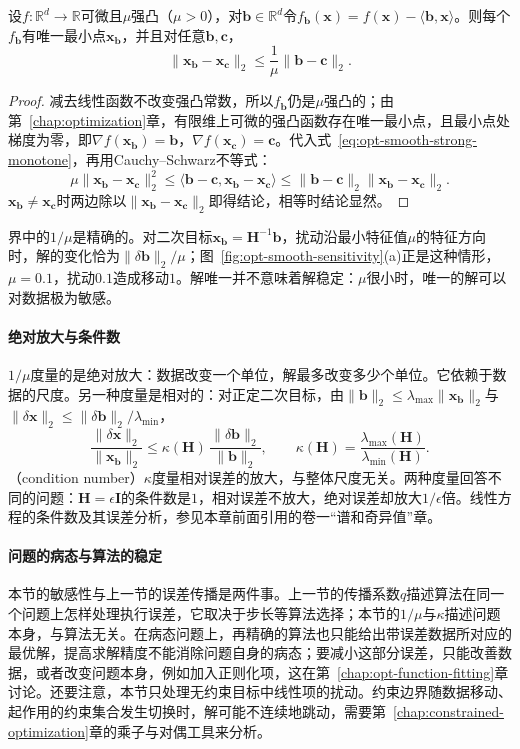 \begin{theorem}[线性扰动下的解变化界]
\label{thm:opt-smooth-perturbation-bound}
设$f:\mathbb R^d\to\mathbb R$可微且$\mu$强凸（$\mu>0$），对$\bm b\in\mathbb R^d$令$f_{\bm b}(\bm x)=f(\bm x)-\langle\bm b,\bm x\rangle$。则每个$f_{\bm b}$有唯一最小点$\bm x_{\bm b}$，并且对任意$\bm b,\bm c$，
\[
  \lVert\bm x_{\bm b}-\bm x_{\bm c}\rVert_2\leq\frac1\mu\lVert\bm b-\bm c\rVert_2 .
\]
\end{theorem}

\begin{proof}
减去线性函数不改变强凸常数，所以$f_{\bm b}$仍是$\mu$强凸的；由第~\ref{chap:optimization}章，有限维上可微的强凸函数存在唯一最小点，且最小点处梯度为零，即$\nabla f(\bm x_{\bm b})=\bm b$，$\nabla f(\bm x_{\bm c})=\bm c$。代入式~\eqref{eq:opt-smooth-strong-monotone}，再用Cauchy--Schwarz不等式：
\[
  \mu\lVert\bm x_{\bm b}-\bm x_{\bm c}\rVert_2^2\leq\langle\bm b-\bm c,\bm x_{\bm b}-\bm x_{\bm c}\rangle\leq\lVert\bm b-\bm c\rVert_2\lVert\bm x_{\bm b}-\bm x_{\bm c}\rVert_2 .
\]
$\bm x_{\bm b}\neq\bm x_{\bm c}$时两边除以$\lVert\bm x_{\bm b}-\bm x_{\bm c}\rVert_2$即得结论，相等时结论显然。
\end{proof}

界中的$1/\mu$是精确的。对二次目标$\bm x_{\bm b}=\bm H^{-1}\bm b$，扰动沿最小特征值$\mu$的特征方向时，解的变化恰为$\lVert\delta\bm b\rVert_2/\mu$；图~\ref{fig:opt-smooth-sensitivity}(a)正是这种情形，$\mu=0.1$，扰动$0.1$造成移动$1$。解唯一并不意味着解稳定：$\mu$很小时，唯一的解可以对数据极为敏感。

\paragraph{绝对放大与条件数}
$1/\mu$度量的是绝对放大：数据改变一个单位，解最多改变多少个单位。它依赖于数据的尺度。另一种度量是相对的：对正定二次目标，由$\lVert\bm b\rVert_2\leq\lambda_{\max}\lVert\bm x_{\bm b}\rVert_2$与$\lVert\delta\bm x\rVert_2\leq\lVert\delta\bm b\rVert_2/\lambda_{\min}$，
\[
  \frac{\lVert\delta\bm x\rVert_2}{\lVert\bm x_{\bm b}\rVert_2}\leq\kappa(\bm H)\,\frac{\lVert\delta\bm b\rVert_2}{\lVert\bm b\rVert_2},\qquad\kappa(\bm H)=\frac{\lambda_{\max}(\bm H)}{\lambda_{\min}(\bm H)} .
\]
（condition number）$\kappa$度量相对误差的放大，与整体尺度无关。两种度量回答不同的问题：$\bm H=\epsilon\bm I$的条件数是$1$，相对误差不放大，绝对误差却放大$1/\epsilon$倍。线性方程的条件数及其误差分析，参见本章前面引用的卷一“谱和奇异值”章。

\paragraph{问题的病态与算法的稳定}
本节的敏感性与上一节的误差传播是两件事。上一节的传播系数$q$描述算法在同一个问题上怎样处理执行误差，它取决于步长等算法选择；本节的$1/\mu$与$\kappa$描述问题本身，与算法无关。在病态问题上，再精确的算法也只能给出带误差数据所对应的最优解，提高求解精度不能消除问题自身的病态；要减小这部分误差，只能改善数据，或者改变问题本身，例如加入正则化项，这在第~\ref{chap:opt-function-fitting}章讨论。还要注意，本节只处理无约束目标中线性项的扰动。约束边界随数据移动、起作用的约束集合发生切换时，解可能不连续地跳动，需要第~\ref{chap:constrained-optimization}章的乘子与对偶工具来分析。
